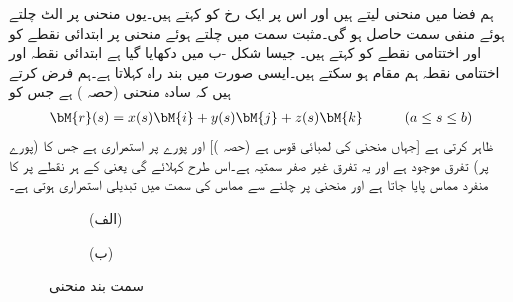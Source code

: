 ہم فضا میں منحنی  لیتے ہیں اور اس پر ایک رخ کو  کہتے ہیں۔یوں منحنی پر الٹ چلتے ہوئے منفی سمت حاصل ہو گی۔مثبت سمت میں چلتے ہوئے منحنی پر ابتدائی نقطے کو  اور اختتامی نقطے کو  کہتے ہیں۔ جیسا شکل -ب میں دکھایا گیا ہے ابتدائی نقطہ اور اختتامی نقطہ ہم مقام ہو سکتے ہیں۔ایسی صورت میں  بند راہ کہلاتا ہے۔ہم فرض کرتے ہیں کہ  سادہ منحنی (حصہ ) ہے  جس کو
\begin{align}\label{مساوات_سمتی_تکمل_راہ_الف}
\bM{r}(s)=x(s)\bM{i}+y(s)\bM{j}+z(s)\bM{k}\quad \quad \quad (a\le s\le b)
\end{align}
 ظاہر کرتی ہے [جہاں  منحنی کی لمبائی قوس ہے (حصہ )] اور پورے  پر  استمراری ہے جس کا (پورے  پر)   تفرق  موجود ہے اور یہ تفرق غیر صفر سمتیہ ہے۔اس طرح   کہلائے گی یعنی  کے ہر نقطے پر  کا منفرد مماس پایا جاتا ہے  اور منحنی پر چلنے سے مماس کی سمت میں تبدیلی استمراری ہوتی ہے۔
\begin{figure}
\centering
\begin{subfigure}{0.5\textwidth}
\centering
{}
\caption*{(الف)}
\end{subfigure}%
\begin{subfigure}{0.5\textwidth}
\centering
{}
\caption*{(ب)}
\end{subfigure}%
\caption{سمت بند منحنی}
\label{شکل_سمتی_تکمل_سمت_بند_منحنی}
\end{figure}

